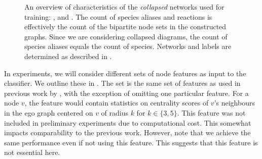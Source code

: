\documentclass[
	fontsize=10pt, %
	twoside=false, %
	secnumdepth=1, %
  toc=indentunnumbered %
]{kaobook}
\begin{document}
\begin{figure}[h]
\begin{subfigure}{0.32\textwidth}
  \end{subfigure} 
  \caption[ An overview of characteristics of networks used for training. ]{ An
    overview of characteristics of the \textit{collapsed} networks used for
    training: \ADLast{}, \PDMap{} and \ReconMap{}. The count of species aliases and reactions is effectively the
    count of the bipartite node sets in the constructed graphs. Since we are
    considering collapsed diagrams, the count of species aliases equals the
    count of species. Networks and labels are determined as described in
    . }
  \label{fig:maps-summary}
\end{figure}





In experiments, we will consider different sets of node features as input to the
classifier. We outline these  in 
. The set  is the same set of
features as used in previous work by \nielsen{}, with the exception of omitting one particular
feature. For a node $v$, the feature would contain statistics on centrality
scores of $v$'s neighbours in the ego graph centered on $v$ of radius $k$ for $k
\in \{3,5\}$. This feature was not included in preliminary experiments due to
computational cost. This somewhat impacts comparability to the previous work.
However, note that we achieve the same performance even if not using this
feature. This suggests that this feature is not essential here.
\end{document}
